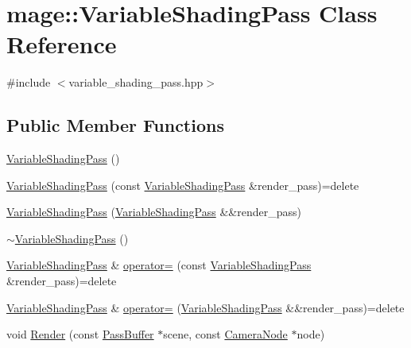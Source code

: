 \hypertarget{classmage_1_1_variable_shading_pass}{}\section{mage\+:\+:Variable\+Shading\+Pass Class Reference}
\label{classmage_1_1_variable_shading_pass}


{\ttfamily \#include $<$variable\+\_\+shading\+\_\+pass.\+hpp$>$}

\subsection*{Public Member Functions}
\begin{DoxyCompactItemize}
\item 
\hyperlink{classmage_1_1_variable_shading_pass_a0c3b30167c1dcdf74daae080f2c799bc}{Variable\+Shading\+Pass} ()
\item 
\hyperlink{classmage_1_1_variable_shading_pass_a98ce8bacba3894ff29d2a13d3a645d22}{Variable\+Shading\+Pass} (const \hyperlink{classmage_1_1_variable_shading_pass}{Variable\+Shading\+Pass} \&render\+\_\+pass)=delete
\item 
\hyperlink{classmage_1_1_variable_shading_pass_afcb297b4d400a6eb119846d4c04fc3d1}{Variable\+Shading\+Pass} (\hyperlink{classmage_1_1_variable_shading_pass}{Variable\+Shading\+Pass} \&\&render\+\_\+pass)
\item 
\hyperlink{classmage_1_1_variable_shading_pass_a1af7915285b239e8e6d14eb0f926dc4a}{$\sim$\+Variable\+Shading\+Pass} ()
\item 
\hyperlink{classmage_1_1_variable_shading_pass}{Variable\+Shading\+Pass} \& \hyperlink{classmage_1_1_variable_shading_pass_ad846c4f7ffc5b795ba1c0fa03bd6c2af}{operator=} (const \hyperlink{classmage_1_1_variable_shading_pass}{Variable\+Shading\+Pass} \&render\+\_\+pass)=delete
\item 
\hyperlink{classmage_1_1_variable_shading_pass}{Variable\+Shading\+Pass} \& \hyperlink{classmage_1_1_variable_shading_pass_a28702f255ccbbabd4b6e3177acd97a8b}{operator=} (\hyperlink{classmage_1_1_variable_shading_pass}{Variable\+Shading\+Pass} \&\&render\+\_\+pass)=delete
\item 
void \hyperlink{classmage_1_1_variable_shading_pass_a03eb92f61b26692521db92af7f78fdaa}{Render} (const \hyperlink{structmage_1_1_pass_buffer}{Pass\+Buffer} $\ast$scene, const \hyperlink{classmage_1_1_camera_node}{Camera\+Node} $\ast$node)
\end{DoxyCompactItemize}
